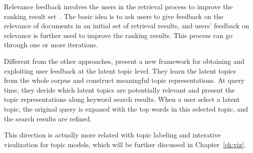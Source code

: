 Relevance feedback involves the users in the retrieval process to improve the ranking result set~\citep{Rocchio-1971}. The basic idea is to ask users to give feedback on the relevance of documents in an initial set of retrieval results, and users' feedback on relevance is further used to improve the ranking results. This process can go through one or more iterations.

Different from the other approaches, \cite{Andrzejewski-2011} present a new framework for obtaining and exploiting user feedback at the latent topic level. They learn the latent topics from the whole corpus and construct meaningful topic representations. At query time, they decide which latent topics are potentially relevant and present the topic representations along keyword search results. When a user select a latent topic, the original query is expaned with the top words in this selected topic, and the search results are refined.

This direction is actually more related with topic labeling and interative visulization for topic models, which will be further discussed in Chapter~\ref{ch:viz}.




